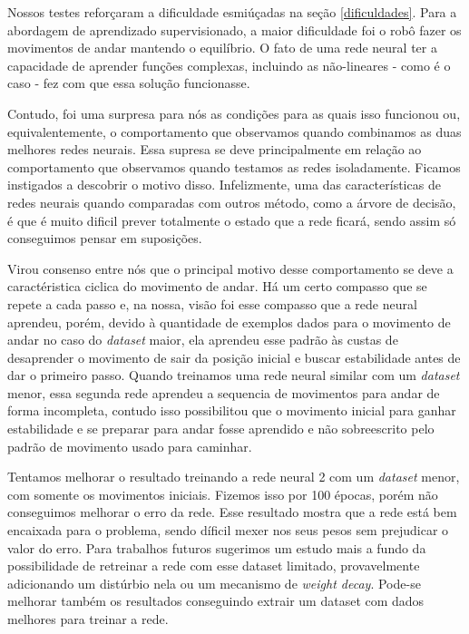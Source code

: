 \documentclass[twoside,conference,a4paper]{IEEEtran}
\begin{document}
Nossos testes reforçaram a dificuldade esmiúçadas na seção \ref{dificuldades}. Para a abordagem de aprendizado supervisionado, a maior dificuldade foi o robô fazer os movimentos de andar mantendo o equilíbrio. O fato de uma rede neural ter a capacidade de aprender funções complexas, incluindo as não-lineares - como é o caso -  fez com que essa solução funcionasse.

Contudo, foi uma surpresa para nós as condições para as quais isso funcionou ou, equivalentemente, o comportamento que observamos quando combinamos as duas melhores redes neurais. Essa supresa se deve principalmente em relação ao comportamento que observamos quando testamos as redes isoladamente. Ficamos instigados a descobrir o motivo disso. Infelizmente, uma das características de redes neurais quando comparadas com outros método, como a árvore de decisão, é que é muito dificil prever totalmente o estado que a rede ficará, sendo assim só conseguimos pensar em suposições.

Virou consenso entre nós que o principal motivo desse comportamento se deve a caractéristica ciclica do movimento de andar. Há um certo compasso que se repete a cada passo e, na nossa, visão foi esse compasso que a rede neural aprendeu, porém, devido à quantidade de exemplos dados para o movimento de andar no caso do \textsl{dataset} maior, ela aprendeu esse padrão às custas de desaprender o movimento de sair da posição inicial e buscar estabilidade antes de dar o primeiro passo. Quando treinamos uma rede neural similar com um \textsl{dataset} menor, essa segunda rede aprendeu a sequencia de movimentos para andar de forma incompleta, contudo isso possibilitou que o movimento inicial para ganhar estabilidade e se preparar para andar fosse aprendido e não sobreescrito pelo padrão de movimento usado para caminhar.

Tentamos melhorar o resultado treinando a rede neural 2 com um \textsl{dataset} menor, com somente os movimentos iniciais. Fizemos isso por 100 épocas, porém não conseguimos melhorar o erro da rede. Esse resultado mostra que a rede está bem encaixada para o problema, sendo díficil mexer nos seus pesos sem prejudicar o valor do erro. Para trabalhos futuros sugerimos um estudo mais a fundo da possibilidade de retreinar a rede com esse dataset limitado, provavelmente adicionando um distúrbio nela ou um mecanismo de \textsl{weight decay}\cite{hastie01statisticallearning}. Pode-se melhorar também os resultados conseguindo extrair um dataset com dados melhores para treinar a rede.
\end{document}
